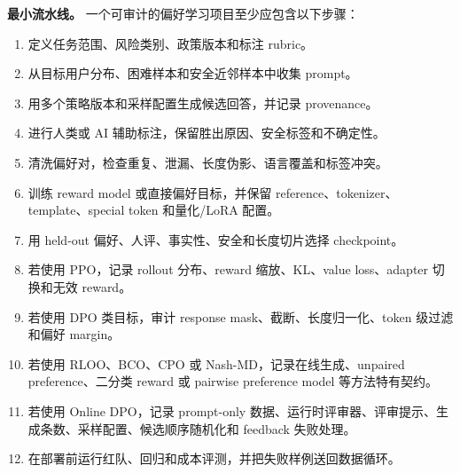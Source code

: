 \documentclass[UTF8,zihao=-4,openany]{ctexbook}
\begin{document}
\textbf{最小流水线。} 一个可审计的偏好学习项目至少应包含以下步骤：
\begin{enumerate}
\item 定义任务范围、风险类别、政策版本和标注 rubric。
\item 从目标用户分布、困难样本和安全近邻样本中收集 prompt。
\item 用多个策略版本和采样配置生成候选回答，并记录 provenance。
\item 进行人类或 AI 辅助标注，保留胜出原因、安全标签和不确定性。
\item 清洗偏好对，检查重复、泄漏、长度伪影、语言覆盖和标签冲突。
\item 训练 reward model 或直接偏好目标，并保留 reference、tokenizer、template、special token 和量化/LoRA 配置。
\item 用 held-out 偏好、人评、事实性、安全和长度切片选择 checkpoint。
\item 若使用 PPO，记录 rollout 分布、reward 缩放、KL、value loss、adapter 切换和无效 reward。
\item 若使用 DPO 类目标，审计 response mask、截断、长度归一化、token 级过滤和偏好 margin。
\item 若使用 RLOO、BCO、CPO 或 Nash-MD，记录在线生成、unpaired preference、二分类 reward 或 pairwise preference model 等方法特有契约。
\item 若使用 Online DPO，记录 prompt-only 数据、运行时评审器、评审提示、生成条数、采样配置、候选顺序随机化和 feedback 失败处理。
\item 在部署前运行红队、回归和成本评测，并把失败样例送回数据循环。
\end{enumerate}
\end{document}
